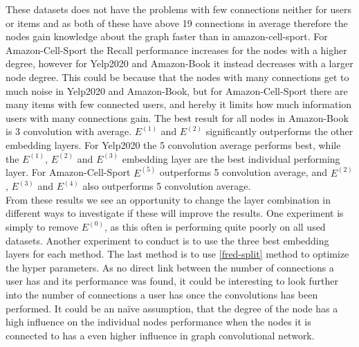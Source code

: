 These datasets does not have the problems with few connections neither for users or items and as both of these have above 19 connections in average therefore the nodes gain knowledge about the graph faster than in amazon-cell-sport.
For Amazon-Cell-Sport the Recall performance increases for the nodes with a higher degree, however for Yelp2020 and Amazon-Book it instead decreases with a larger node degree.
This could be because that the nodes with many connections get to much noise in Yelp2020 and Amazon-Book, but for Amazon-Cell-Sport there are many items with few connected users, and hereby it limits how much information users with many connections gain.
The best result for all nodes in Amazon-Book is 3 convolution with average.
$E^{(1)}$ and $E^{(2)}$ significantly outperforms the other embedding layers.  
For Yelp2020 the 5 convolution average performs best, while the $E^{(1)}$, $E^{(2)}$ and $E^{(3)}$ embedding layer are the best individual performing layer.
For Amazon-Cell-Sport $E^{(5)}$ outperforms 5 convolution average, and $E^{(2)}$, $E^{(3)}$ and $E^{(4)}$ also outperforms 5 convolution average.
\\
From these results we see an opportunity to change the layer combination in different ways to investigate if these will improve the results.
One experiment is simply to remove $E^{(0)}$, as this often is performing quite poorly on all used datasets.
Another experiment to conduct is to use the three best embedding layers for each method.
The last method is to use \autoref{fred-split} method to optimize the hyper parameters.
As no direct link between the number of connections a user has and its performance was found, it could be interesting to look further into the number of connections a user has once the convolutions has been performed. 
It could be an naïve assumption, that the degree of the node has a high influence on the individual nodes performance when the nodes it is connected to has a even higher influence in graph convolutional network.


